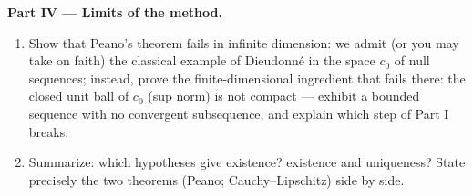 \begin{problem}[{Weekend problem --- existence of solutions of
$x' = f(t, x)$ without Lipschitz}]
\medskip
\noindent\textbf{Part IV --- Limits of the method.}
\begin{enumerate}[resume]
  \item Show that Peano's theorem fails in infinite dimension:
        we admit (or you may take on faith) the classical
        example of Dieudonn\'e in the space $c_0$ of null
        sequences; instead, prove the finite-dimensional
        ingredient that fails there: the closed unit ball of
        $c_0$ (sup norm) is not compact --- exhibit a bounded
        sequence with no convergent subsequence, and explain
        which step of Part I breaks.
  \item Summarize: which hypotheses give existence? existence
        and uniqueness? State precisely the two theorems
        (Peano; Cauchy--Lipschitz) side by side.
\end{enumerate}


\end{problem}
